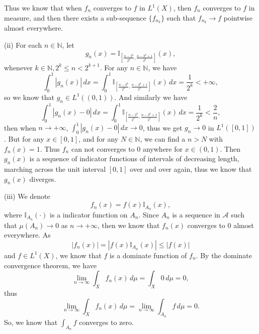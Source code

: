 \documentclass[12pt,a4paper]{ctexart}
\begin{document}
Thus we know that when $f_{n}$ converges to $f$ in $L^{1}(X)$, then $f_{n}$ converges to $f$ in measure, and then there exists a sub-sequence $\{f_{n_{k}}\}$ such that $f_{n_{k}} \to f$ pointwise almost everywhere.

\vspace{8pt}

(ii) For each $n \in \mathbb N$, let
\begin{equation*}
    g_{n} (x) = \mathbb{I}_{[\frac{n - 2^{k}}{2^{k}}, \frac{n - 2^{k} + 1}{2^{k}}]} (x),
\end{equation*}
whenever $k \in \mathbb N, 2^{k} \leq n < 2^{k + 1}$. For any $n \in \mathbb{N}$, we have
\begin{equation*}
    \int_{0}^{1} | g_{n} (x) | \, d x = \int_{0}^{1} \mathbb{I}_{[\frac{n - 2^{k}}{2^{k}}, \frac{n - 2^{k} + 1}{2^{k}}]} (x) \, d x  = \frac{1}{2^{k}} < +\infty,
\end{equation*}
so we know that $g_{n} \in L^{1}((0, 1))$. And similarly we have
\begin{equation*}
    \int_{0}^{1} | g_{n} (x) - 0 | \, d x = \int_{0}^{1} \mathbb{I}_{[\frac{n - 2^{k}}{2^{k}}, \frac{n - 2^{k} + 1}{2^{k}}]} (x) \, d x  = \frac{1}{2^{k}} < \frac{2}{n},
\end{equation*}
then when $n \to + \infty$, $\int_{0}^{1} | g_{n} (x) - 0 | \, d x \to 0$, thus we get $g_{n} \to 0$ in $L^{1}([0, 1])$. But for any $x \in [0, 1]$, and for any $N \in \mathbb{N}$, we can find a $n > N$ with $f_{n} (x) = 1$. Thus $f_{n}$ can not converges to $0$ anywhere for $x \in (0, 1)$. Then $g_{n}(x)$ is a sequence of indicator functions of intervals of decreasing length, marching across the unit interval $[0,1]$ over and over again, thus we know that $g_{n}(x)$ diverges.

\vspace{8pt}

(iii) We denote
\begin{equation*}
   f_{n}(x) = f(x) \mathbb{I}_{A_{n}} (x),
\end{equation*}
where $\mathbb{I}_{A_{n}} (\cdot)$ is a indicator function on $A_{n}$. Since $A_{n}$ is a sequence in $\mathcal{A}$ such that $\mu(A_{n}) \to 0$ as $n \to + \infty$, then we know that $f_{n}(x)$ converges to $0$ almost everywhere. As
\begin{equation*}
   |f_{n}(x)| = |f(x) \mathbb{I}_{A_{n}} (x)| \leq |f(x)|
\end{equation*}
and $f \in L^{1}(X)$, we know that $f$ is a dominate function of $f_{n}$. By the dominate convergence theorem, we have
\begin{equation*}
   \lim_{n \to \infty} \int_{X}^{} f_{n}(x) \, d \mu = \int_{X}^{} 0 \, d \mu = 0,
\end{equation*}
thus
\begin{equation*}
   \lim_{n \to \infty} \int_{X}^{} f_{n}(x) \, d \mu = \lim_{n \to \infty} \int_{A_{n}}^{} f \, d \mu = 0.
\end{equation*}
So, we know that $\int_{A_{n}}^{} f$ converges to zero.
\end{document}

